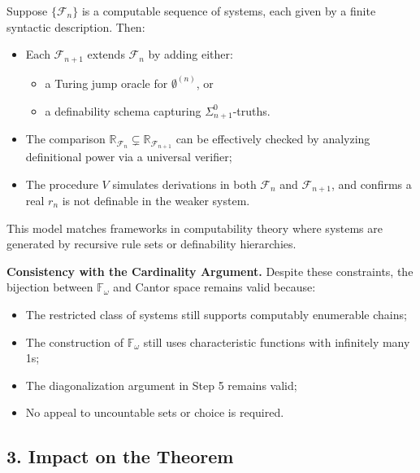 \documentclass[12pt]{article}
\theoremstyle{definition}
\theoremstyle{plain}
\theoremstyle{remark}
\begin{document}
Suppose \( \{\mathcal{F}_n\} \) is a computable sequence of systems, each given by a finite syntactic description. Then:
\begin{itemize}
    \item Each \( \mathcal{F}_{n+1} \) extends \( \mathcal{F}_n \) by adding either:
    \begin{itemize}
      \item a Turing jump oracle for \( \emptyset^{(n)} \), or
      \item a definability schema capturing \( \Sigma^0_{n+1} \)-truths.
    \end{itemize}
    \item The comparison \( \mathbb{R}_{\mathcal{F}_n} \subsetneq \mathbb{R}_{\mathcal{F}_{n+1}} \) can be effectively checked by analyzing definitional power via a universal verifier;
    \item The procedure \( V \) simulates derivations in both \( \mathcal{F}_n \) and \( \mathcal{F}_{n+1} \), and confirms a real \( r_n \) is not definable in the weaker system.
\end{itemize}

This model matches frameworks in computability theory where systems are generated by recursive rule sets or definability hierarchies.

\noindent\textbf{Consistency with the Cardinality Argument.}
Despite these constraints, the bijection between \( \mathbb{F}_\omega \) and Cantor space remains valid because:
\begin{itemize}
    \item The restricted class of systems still supports computably enumerable chains;
    \item The construction of \( \mathbb{F}_\omega \) still uses characteristic functions with infinitely many 1s;
    \item The diagonalization argument in Step 5 remains valid;
    \item No appeal to uncountable sets or choice is required.
\end{itemize}

\subsection*{3. Impact on the Theorem}
\end{document}
